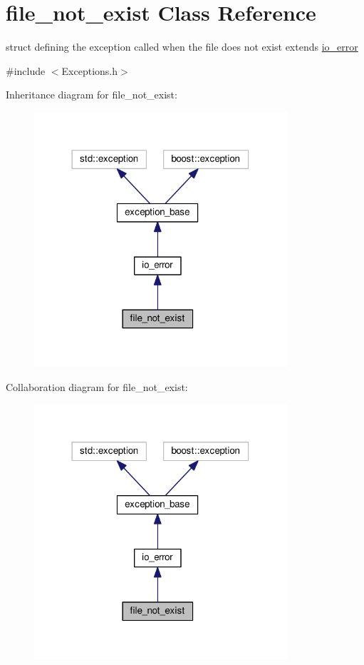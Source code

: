 \hypertarget{structfile__not__exist}{\section{file\+\_\+not\+\_\+exist Class Reference}
\label{structfile__not__exist}
}


struct defining the exception called when the file does not exist extends \hyperlink{structio__error}{io\+\_\+error}  




{\ttfamily \#include $<$Exceptions.\+h$>$}



Inheritance diagram for file\+\_\+not\+\_\+exist\+:\nopagebreak
\begin{figure}[H]
\begin{center}
\leavevmode
\includegraphics[width=266pt]{structfile__not__exist__inherit__graph}
\end{center}
\end{figure}


Collaboration diagram for file\+\_\+not\+\_\+exist\+:\nopagebreak
\begin{figure}[H]
\begin{center}
\leavevmode
\includegraphics[width=266pt]{structfile__not__exist__coll__graph}
\end{center}
\end{figure}


